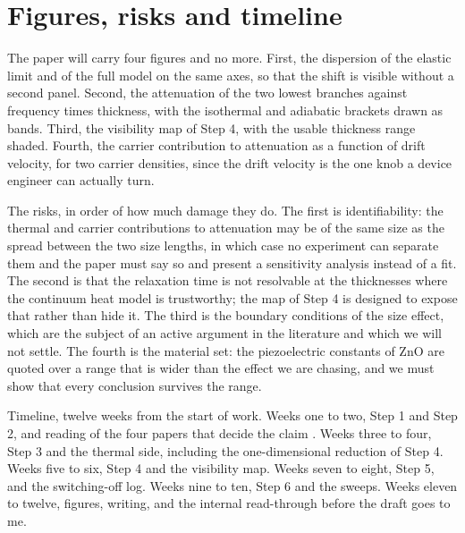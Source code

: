 \documentclass[11pt]{article}
\begin{document}
\section{Figures, risks and timeline}

The paper will carry four figures and no more. First, the dispersion of the elastic limit and of the full
model on the same axes, so that the shift is visible without a second panel. Second, the attenuation of the
two lowest branches against frequency times thickness, with the isothermal and adiabatic brackets drawn as
bands. Third, the visibility map of Step 4, with the usable thickness range shaded. Fourth, the
carrier contribution to attenuation as a function of drift velocity, for two carrier densities, since the
drift velocity is the one knob a device engineer can actually turn.

The risks, in order of how much damage they do. The first is identifiability: the thermal and carrier
contributions to attenuation may be of the same size as the spread between the two size lengths, in which
case no experiment can separate them and the paper must say so and present a sensitivity analysis instead
of a fit. The second is that the relaxation time is not resolvable at the thicknesses where the continuum
heat model is trustworthy; the map of Step 4 is designed to expose that rather than hide it. The third is
the boundary conditions of the size effect, which are the subject of an active argument in the literature
\cite{Barretta2018} and which we will not settle. The fourth is the material set: the piezoelectric
constants of ZnO are quoted over a range that is wider than the effect we are chasing, and we must show
that every conclusion survives the range.

Timeline, twelve weeks from the start of work. Weeks one to two, Step 1 and Step 2, and reading of the four
papers that decide the claim \cite{Qu2023,Sharma2004,Othmani2017,YangZhou2005}. Weeks three to four, Step 3
and the thermal side, including the one-dimensional reduction of Step 4. Weeks five to six, Step 4 and the
visibility map. Weeks seven to eight, Step 5, and the switching-off log. Weeks nine to ten, Step 6 and the
sweeps. Weeks eleven to twelve, figures, writing, and the internal read-through before the draft goes to
me.
\end{document}
